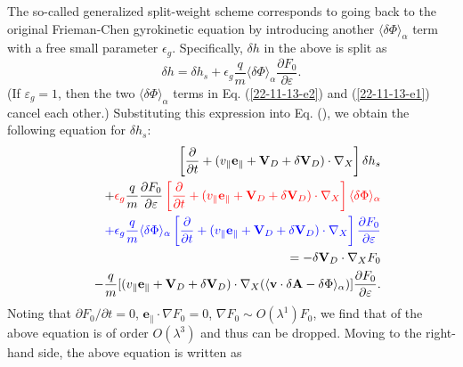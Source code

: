 \documentclass{article}
\newcommand{\tmcolor}[2]{{\color{#1}{#2}}}
\begin{document}
The so-called generalized split-weight scheme corresponds to going back to the
original Frieman-Chen gyrokinetic equation by introducing another $\langle
\delta \Phi \rangle_{\alpha}$ term with a free small parameter $\epsilon_g$.
Specifically, $\delta h$ in the above is split as
\begin{equation}
  \label{22-11-13-e1} \delta h = \delta h_s + \epsilon_g \frac{q}{m} \langle
  \delta \Phi \rangle_{\alpha} \frac{\partial F_0}{\partial \varepsilon} .
\end{equation}
(If $\varepsilon_g = 1$, then the two $\langle \delta \Phi \rangle_{\alpha}$
terms in Eq. (\ref{22-11-13-e2}) and (\ref{22-11-13-e1}) cancel each other.)
Substituting this expression into Eq. (), we obtain the following equation for
$\delta h_s$:
\begin{eqnarray}
  &  & \left[ \frac{\partial}{\partial t} + (v_{\parallel}
  \mathbf{e}_{\parallel} +\mathbf{V}_D + \delta \mathbf{V}_D) \cdot \nabla_X
  \right] \delta h_s \nonumber\\
  &  & + \tmcolor{red}{\epsilon_g \tmcolor{black}{\frac{q}{m} \frac{\partial
  F_0}{\partial \varepsilon}} \left[ \frac{\partial}{\partial t} +
  (v_{\parallel} \mathbf{e}_{\parallel} +\mathbf{V}_D + \delta \mathbf{V}_D)
  \cdot \nabla_X \right] \langle \delta \Phi \rangle_{\alpha}} \nonumber\\
  &  & \tmcolor{blue}{+ \epsilon_g \frac{q}{m} \langle \delta \Phi
  \rangle_{\alpha} \left[ \frac{\partial}{\partial t} + (v_{\parallel}
  \mathbf{e}_{\parallel} +\mathbf{V}_D + \delta \mathbf{V}_D) \cdot \nabla_X
  \right] \frac{\partial F_0}{\partial \varepsilon}} \nonumber\\
  &  & = - \delta \mathbf{V}_D \cdot \nabla_X F_0 \nonumber\\
  &  & - \frac{q}{m} [(v_{\parallel} \mathbf{e}_{\parallel} +\mathbf{V}_D +
  \delta \mathbf{V}_D) \cdot \nabla_X (\langle \mathbf{v} \cdot \delta
  \mathbf{A}- \delta \Phi \rangle_{\alpha})] \frac{\partial F_0}{\partial
  \varepsilon} .  \label{19-1-10-7m}
\end{eqnarray}
Noting that $\partial F_0 / \partial t = 0$, $\mathbf{e}_{\parallel} \cdot
\nabla F_0 = 0$, $\nabla F_0 \sim O (\lambda^1) F_0$, we find that
\tmcolor{blue}{the third line} of the above equation is of order $O
(\lambda^3)$ and thus can be dropped. Moving \tmcolor{red}{the second line} to
the right-hand side, the above equation is written as
\end{document}
